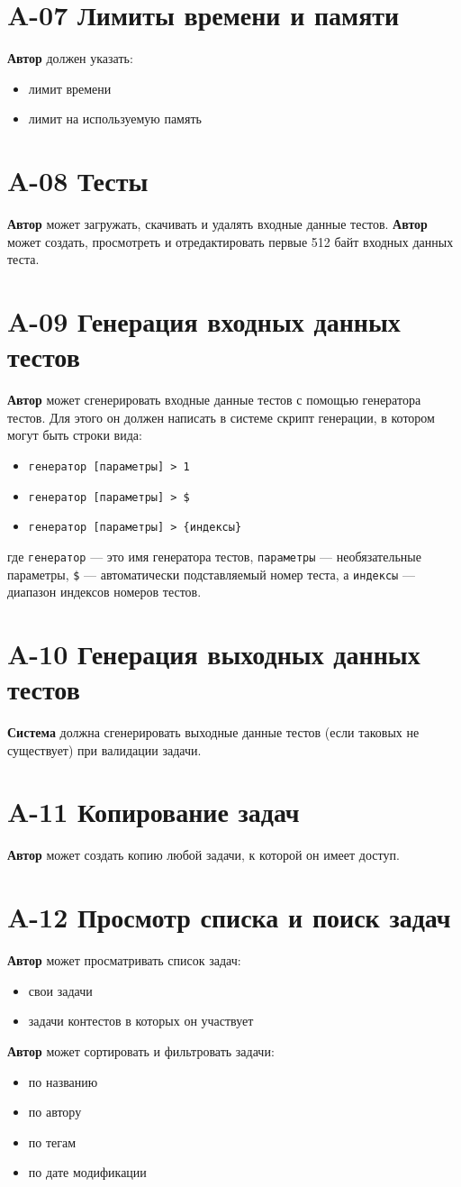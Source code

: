 \documentclass{book}
\newcommand{\newcard}[1]{\newpage \section*{#1}}
\begin{document}
\newcard{A-07 Лимиты времени и памяти}
\textbf{Автор} должен указать:
\begin{itemize}\setlength{\itemsep}{0pt}
	\item лимит времени
	\item лимит на используемую память
\end{itemize}


\newcard{A-08 Тесты}
\textbf{Автор} может загружать, скачивать и удалять входные данные тестов.
\textbf{Автор} может создать, просмотреть и отредактировать первые 512 байт входных данных теста.


\newcard{A-09 Генерация входных данных тестов}
\textbf{Автор} может сгенерировать входные данные тестов с помощью генератора тестов. Для этого он должен написать в системе скрипт генерации, в котором могут быть строки вида:
\begin{itemize}\setlength{\itemsep}{0pt}
	\item \texttt{генератор [параметры] > 1}
	\item \texttt{генератор [параметры] > \$}
	\item \texttt{генератор [параметры] > \{индексы\}}
\end{itemize}
где \texttt{генератор} — это имя генератора тестов, \texttt{параметры} — необязательные параметры, \texttt{\$} — автоматически подставляемый номер теста, а \texttt{индексы} — диапазон индексов номеров тестов.


\newcard{A-10 Генерация выходных данных тестов}
\textbf{Система} должна сгенерировать выходные данные тестов (если таковых не существует) при валидации задачи.


\newcard{A-11 Копирование задач}
\textbf{Автор} может создать копию любой задачи, к которой он имеет доступ.


\newcard{A-12 Просмотр списка и поиск задач}
\textbf{Автор} может просматривать список задач:
\begin{itemize}\setlength{\itemsep}{0pt}
	\item свои задачи
	\item задачи контестов в которых он участвует 
\end{itemize}

\textbf{Автор} может сортировать и фильтровать задачи:
\begin{itemize}\setlength{\itemsep}{0pt}
	\item по названию
	\item по автору
	\item по тегам
	\item по дате модификации 
\end{itemize}
\end{document}
